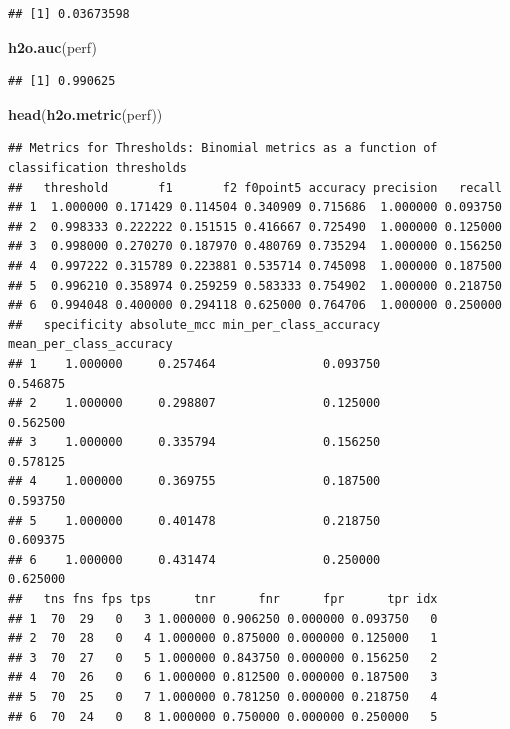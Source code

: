 \documentclass[]{article}
\newenvironment{Shaded}{\begin{snugshade}}{\end{snugshade}}
\newcommand{\KeywordTok}[1]{\textcolor[rgb]{0.13,0.29,0.53}{\textbf{{#1}}}}
\newcommand{\NormalTok}[1]{{#1}}
\begin{document}
\begin{verbatim}
## [1] 0.03673598
\end{verbatim}

\begin{Shaded}
\begin{Highlighting}[]
\KeywordTok{h2o.auc}\NormalTok{(perf)}
\end{Highlighting}
\end{Shaded}

\begin{verbatim}
## [1] 0.990625
\end{verbatim}

\begin{Shaded}
\begin{Highlighting}[]
\KeywordTok{head}\NormalTok{(}\KeywordTok{h2o.metric}\NormalTok{(perf))}
\end{Highlighting}
\end{Shaded}

\begin{verbatim}
## Metrics for Thresholds: Binomial metrics as a function of classification thresholds
##   threshold       f1       f2 f0point5 accuracy precision   recall
## 1  1.000000 0.171429 0.114504 0.340909 0.715686  1.000000 0.093750
## 2  0.998333 0.222222 0.151515 0.416667 0.725490  1.000000 0.125000
## 3  0.998000 0.270270 0.187970 0.480769 0.735294  1.000000 0.156250
## 4  0.997222 0.315789 0.223881 0.535714 0.745098  1.000000 0.187500
## 5  0.996210 0.358974 0.259259 0.583333 0.754902  1.000000 0.218750
## 6  0.994048 0.400000 0.294118 0.625000 0.764706  1.000000 0.250000
##   specificity absolute_mcc min_per_class_accuracy mean_per_class_accuracy
## 1    1.000000     0.257464               0.093750                0.546875
## 2    1.000000     0.298807               0.125000                0.562500
## 3    1.000000     0.335794               0.156250                0.578125
## 4    1.000000     0.369755               0.187500                0.593750
## 5    1.000000     0.401478               0.218750                0.609375
## 6    1.000000     0.431474               0.250000                0.625000
##   tns fns fps tps      tnr      fnr      fpr      tpr idx
## 1  70  29   0   3 1.000000 0.906250 0.000000 0.093750   0
## 2  70  28   0   4 1.000000 0.875000 0.000000 0.125000   1
## 3  70  27   0   5 1.000000 0.843750 0.000000 0.156250   2
## 4  70  26   0   6 1.000000 0.812500 0.000000 0.187500   3
## 5  70  25   0   7 1.000000 0.781250 0.000000 0.218750   4
## 6  70  24   0   8 1.000000 0.750000 0.000000 0.250000   5
\end{verbatim}
\end{document}
